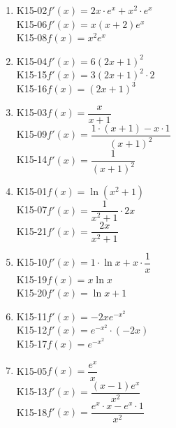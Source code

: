 \documentclass[11pt,a4paper]{article}
\begin{document}
\begin{enumerate}[leftmargin=1.6em, itemsep=0.7em]
\item \begin{minipage}[t]{\linewidth}\textsf{\small K15-02}\quad $f'(x) = 2x \cdot e^x + x^2 \cdot e^x$ \\ \textsf{\small K15-06}\quad $f'(x) = x(x + 2)e^x$ \\ \textsf{\small K15-08}\quad $f(x) = x^2 e^x$\end{minipage}
\item \begin{minipage}[t]{\linewidth}\textsf{\small K15-04}\quad $f'(x) = 6(2x + 1)^2$ \\ \textsf{\small K15-15}\quad $f'(x) = 3(2x + 1)^2 \cdot 2$ \\ \textsf{\small K15-16}\quad $f(x) = (2x + 1)^3$\end{minipage}
\item \begin{minipage}[t]{\linewidth}\textsf{\small K15-03}\quad $f(x) = \dfrac{x}{x + 1}$ \\ \textsf{\small K15-09}\quad $f'(x) = \dfrac{1 \cdot (x + 1) - x \cdot 1}{(x + 1)^2}$ \\ \textsf{\small K15-14}\quad $f'(x) = \dfrac{1}{(x + 1)^2}$\end{minipage}
\item \begin{minipage}[t]{\linewidth}\textsf{\small K15-01}\quad $f(x) = \ln(x^2 + 1)$ \\ \textsf{\small K15-07}\quad $f'(x) = \dfrac{1}{x^2 + 1} \cdot 2x$ \\ \textsf{\small K15-21}\quad $f'(x) = \dfrac{2x}{x^2 + 1}$\end{minipage}
\item \begin{minipage}[t]{\linewidth}\textsf{\small K15-10}\quad $f'(x) = 1 \cdot \ln x + x \cdot \dfrac{1}{x}$ \\ \textsf{\small K15-19}\quad $f(x) = x \ln x$ \\ \textsf{\small K15-20}\quad $f'(x) = \ln x + 1$\end{minipage}
\item \begin{minipage}[t]{\linewidth}\textsf{\small K15-11}\quad $f'(x) = -2x e^{-x^2}$ \\ \textsf{\small K15-12}\quad $f'(x) = e^{-x^2} \cdot (-2x)$ \\ \textsf{\small K15-17}\quad $f(x) = e^{-x^2}$\end{minipage}
\item \begin{minipage}[t]{\linewidth}\textsf{\small K15-05}\quad $f(x) = \dfrac{e^x}{x}$ \\ \textsf{\small K15-13}\quad $f'(x) = \dfrac{(x - 1)e^x}{x^2}$ \\ \textsf{\small K15-18}\quad $f'(x) = \dfrac{e^x \cdot x - e^x \cdot 1}{x^2}$\end{minipage}
\end{enumerate}
\end{document}
